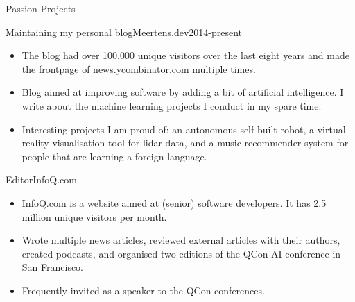 \documentclass[]{mcdowellcv}
\begin{document}
	\begin{cvsection}{Passion Projects}
		\begin{cvsubsection}{Maintaining my personal blog}{Meertens.dev}{2014-present}
			\begin{itemize}
				\item The blog had over 100.000 unique visitors over the last eight years and made the frontpage of news.ycombinator.com multiple times. 
				\item Blog aimed at improving software by adding a bit of artificial intelligence.  I write about the machine learning projects I conduct in my spare time.  
				\item Interesting projects I am proud of: an autonomous self-built robot, a virtual reality visualisation tool for lidar data, and a music recommender system for people that are learning a foreign language. 
			\end{itemize}
		\end{cvsubsection}

		\begin{cvsubsection}{Editor}{InfoQ.com}{}
			\begin{itemize}
				\item InfoQ.com is a website aimed at (senior) software developers.  It has 2.5 million unique visitors per month. 
				\item Wrote multiple news articles, reviewed external articles with their authors, created podcasts, and organised two editions of the QCon AI conference in San Francisco. 
				\item Frequently invited as a speaker to the QCon conferences. 
			\end{itemize}
		\end{cvsubsection}




	\end{cvsection}
	
\end{document}
